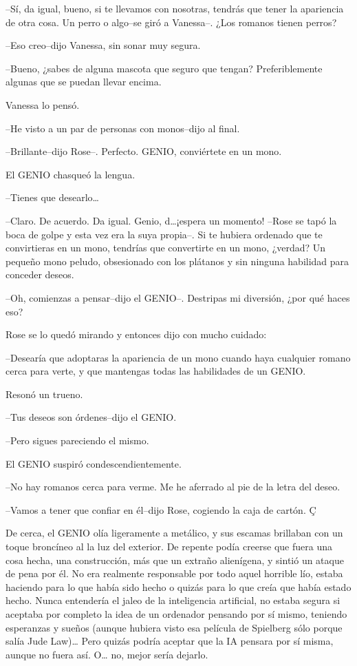 --Sí, da igual, bueno, si te llevamos con nosotras, tendrás que tener la
apariencia de otra cosa. Un perro o algo--se giró a Vanessa--. ¿Los
romanos tienen perros?

--Eso creo--dijo Vanessa, sin sonar muy segura.

--Bueno, ¿sabes de alguna mascota que seguro que tengan? Preferiblemente
algunas que se puedan llevar encima.

Vanessa lo pensó.

--He visto a un par de personas con monos--dijo al final.

--Brillante--dijo Rose--. Perfecto. GENIO, conviértete en un mono.

El GENIO chasqueó la lengua.

--Tienes que desearlo\ldots{}

--Claro. De acuerdo. Da igual. Genio, d\ldots{}¡espera un momento!
--Rose se tapó la boca de golpe y esta vez era la suya propia--. Si te
hubiera ordenado que te convirtieras en un mono, tendrías que
convertirte en un mono, ¿verdad? Un pequeño mono peludo, obsesionado con
los plátanos y sin ninguna habilidad para conceder deseos.

--Oh, comienzas a pensar--dijo el GENIO--. Destripas mi diversión, ¿por
qué haces eso?

Rose se lo quedó mirando y entonces dijo con mucho cuidado:

--Desearía que adoptaras la apariencia de un mono cuando haya cualquier
romano cerca para verte, y que mantengas todas las habilidades de un
GENIO.

Resonó un trueno.

--Tus deseos son órdenes--dijo el GENIO.

--Pero sigues pareciendo el mismo.

El GENIO suspiró condescendientemente.

--No hay romanos cerca para verme. Me he aferrado al pie de la letra del
deseo.

--Vamos a tener que confiar en él--dijo Rose, cogiendo la caja de
cartón. Ç

De cerca, el GENIO olía ligeramente a metálico, y sus escamas brillaban
con un toque broncíneo al la luz del exterior. De repente podía creerse
que fuera una cosa hecha, una construcción, más que un extraño
alienígena, y sintió un ataque de pena por él. No era realmente
responsable por todo aquel horrible lío, estaba haciendo para lo que
había sido hecho o quizás para lo que creía que había estado hecho.
Nunca entendería el jaleo de la inteligencia artificial, no estaba
segura si aceptaba por completo la idea de un ordenador pensando por sí
mismo, teniendo esperanzas y sueños (aunque hubiera visto esa película
de Spielberg sólo porque salía Jude Law)\ldots{} Pero quizás podría
aceptar que la IA pensara por sí misma, aunque no fuera así. O\ldots{}
no, mejor sería dejarlo.

